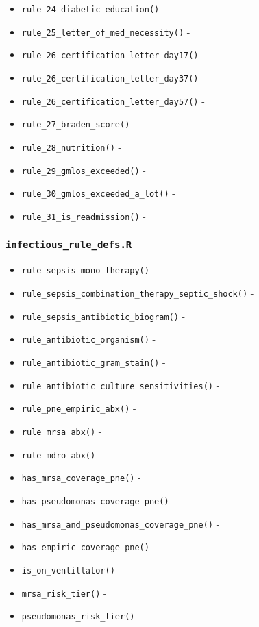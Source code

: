 \documentclass[
]{book}
\providecommand{\tightlist}{%
  \setlength{\itemsep}{0pt}\setlength{\parskip}{0pt}}
\begin{document}
\begin{itemize}
\item
  \texttt{rule\_24\_diabetic\_education()} -
\item
  \texttt{rule\_25\_letter\_of\_med\_necessity()} -
\item
  \texttt{rule\_26\_certification\_letter\_day17()} -
\item
  \texttt{rule\_26\_certification\_letter\_day37()} -
\item
  \texttt{rule\_26\_certification\_letter\_day57()} -
\item
  \texttt{rule\_27\_braden\_score()} -
\item
  \texttt{rule\_28\_nutrition()} -
\item
  \texttt{rule\_29\_gmlos\_exceeded()} -
\item
  \texttt{rule\_30\_gmlos\_exceeded\_a\_lot()} -
\item
  \texttt{rule\_31\_is\_readmission()} -
\end{itemize}

\hypertarget{infectious_rule_defs.r-1}{%
\subsubsection{\texorpdfstring{\texttt{infectious\_rule\_defs.R}}{infectious\_rule\_defs.R}}\label{infectious_rule_defs.r-1}}

\begin{itemize}
\tightlist
\item
  \texttt{rule\_sepsis\_mono\_therapy()} -
\item
  \texttt{rule\_sepsis\_combination\_therapy\_septic\_shock()} -
\item
  \texttt{rule\_sepsis\_antibiotic\_biogram()} -
\item
  \texttt{rule\_antibiotic\_organism()} -
\item
  \texttt{rule\_antibiotic\_gram\_stain()} -
\item
  \texttt{rule\_antibiotic\_culture\_sensitivities()} -
\item
  \texttt{rule\_pne\_empiric\_abx()} -
\item
  \texttt{rule\_mrsa\_abx()} -
\item
  \texttt{rule\_mdro\_abx()} -
\item
  \texttt{has\_mrsa\_coverage\_pne()} -
\item
  \texttt{has\_pseudomonas\_coverage\_pne()} -
\item
  \texttt{has\_mrsa\_and\_pseudomonas\_coverage\_pne()} -
\item
  \texttt{has\_empiric\_coverage\_pne()} -
\item
  \texttt{is\_on\_ventillator()} -
\item
  \texttt{mrsa\_risk\_tier()} -
\item
  \texttt{pseudomonas\_risk\_tier()} -
\end{itemize}
\end{document}

